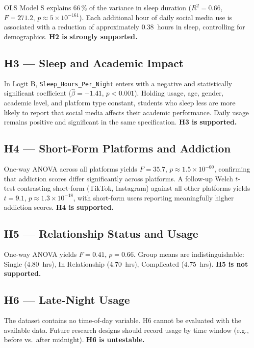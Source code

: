 \documentclass[10pt]{article}
\begin{document}
OLS Model S explains 66\,\% of the variance in sleep duration ($R^2 = 0.66$,
$F = 271.2$, $p \approx 5\times10^{-161}$). Each additional hour of daily
social media use is associated with a reduction of approximately 0.38~hours in
sleep, controlling for demographics. \textbf{H2 is strongly supported.}

\subsection{H3 --- Sleep and Academic Impact}

In Logit B, \texttt{Sleep\_Hours\_Per\_Night} enters with a negative and
statistically significant coefficient ($\hat\beta = -1.41$, $p < 0.001$).
Holding usage, age, gender, academic level, and platform type constant,
students who sleep less are more likely to report that social media affects
their academic performance. Daily usage remains positive and significant in the
same specification. \textbf{H3 is supported.}

\subsection{H4 --- Short-Form Platforms and Addiction}

One-way ANOVA across all platforms yields $F = 35.7$,
$p \approx 1.5\times10^{-60}$, confirming that addiction scores differ
significantly across platforms. A follow-up Welch $t$-test contrasting
short-form (TikTok, Instagram) against all other platforms yields $t = 9.1$,
$p \approx 1.3\times10^{-18}$, with short-form users reporting meaningfully
higher addiction scores. \textbf{H4 is supported.}

\subsection{H5 --- Relationship Status and Usage}

One-way ANOVA yields $F = 0.41$, $p = 0.66$. Group means are
indistinguishable: Single (4.80~hrs), In Relationship (4.70~hrs), Complicated
(4.75~hrs). \textbf{H5 is not supported.}

\subsection{H6 --- Late-Night Usage}

The dataset contains no time-of-day variable. H6 cannot be evaluated with the
available data. Future research designs should record usage by time window
(e.g., before vs.\ after midnight). \textbf{H6 is untestable.}
\end{document}
